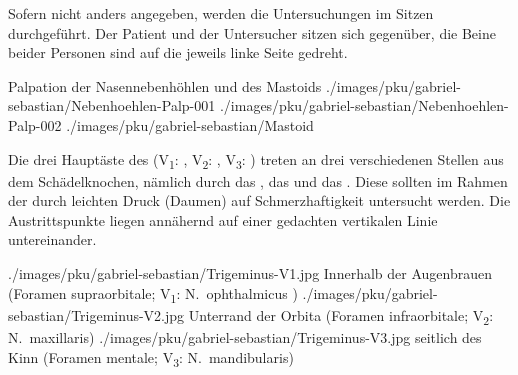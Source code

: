 {Sofern nicht anders angegeben, werden die Untersuchungen im
Sitzen durchgeführt. Der Patient und der Untersucher sitzen
sich gegenüber, die Beine beider Personen sind auf die
jeweils linke Seite gedreht.

}
{}
{}
{}
{}




\begin{PictureSeriesWide}{}{Palpation der Nasennebenhöhlen und des Mastoids}
{./images/pku/gabriel-sebastian/Nebenhoehlen-Palp-001}
{}
{./images/pku/gabriel-sebastian/Nebenhoehlen-Palp-002}
{}
{./images/pku/gabriel-sebastian/Mastoid}
{}
{}
{}
\end{PictureSeriesWide}

{Die drei Hauptäste des 
(V\textsubscript{1}: , 
V\textsubscript{2}: ,
V\textsubscript{3}: ) 
treten an drei verschiedenen Stellen aus dem
Schädelknochen, nämlich durch das
, das
 und das
. Diese sollten im
Rahmen der  durch leichten Druck (Daumen) auf
Schmerzhaftigkeit untersucht werden. Die Austrittspunkte
liegen annähernd auf einer gedachten vertikalen Linie
untereinander.} 
{}
{}
{}
{}

\begin{PictureSeriesWide}{}{}
{./images/pku/gabriel-sebastian/Trigeminus-V1.jpg}
{Innerhalb der Augenbrauen 
(Foramen supraorbitale; V\textsubscript{1}:
N.~ophthalmicus ) }
{./images/pku/gabriel-sebastian/Trigeminus-V2.jpg}
{Unterrand der Orbita 
(Foramen infraorbitale; V\textsubscript{2}:
N.~maxillaris) }
{./images/pku/gabriel-sebastian/Trigeminus-V3.jpg}
{seitlich des Kinn 
(Foramen mentale; V\textsubscript{3}:
N.~mandibularis)}
{}
{}
\end{PictureSeriesWide}




